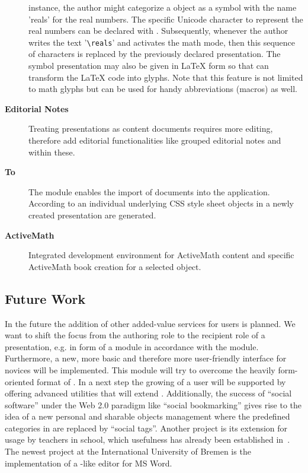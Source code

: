 \begin{description}
  instance, the author might categorize a {\ppt} object as a symbol with the name 'reals'
  for the real numbers. The specific Unicode character to represent the real numbers can
  be declared with {\cpoint}. Subsequently, whenever the author writes the text
  '\verb|\reals|' and activates the math mode, then this sequence of characters is
  replaced by the previously declared presentation. The symbol presentation may also be
  given in {\LaTeX} form so that {\texpoint} can transform the {\LaTeX} code into {\ppt}
  glyphs. Note that this feature is not limited to math glyphs but can be used for handy
  abbreviations (macros) as well.
\item[{\bf Editorial Notes}\twin{editorial}{note}] Treating {\ppt} presentations as
  content documents requires more editing, therefore {\cpnotes} add editorial
  functionalities like grouped editorial notes and {} within these.
\item[{\bf {\omdoc} To {\ppt}}] The {\cpimport} module enables the import of {\omdoc}
  documents into the {\ppt} application. According to an individual underlying CSS style sheet {\ppt}
  objects in a newly created {\ppt} presentation are generated.
\item[{\bf ActiveMath}] Integrated development environment for ActiveMath content and
  specific ActiveMath book creation for a selected {\ppt} object.
\end{description}

\subsection{Future Work}
In the future the addition of other added-value services for users is planned. We want to
shift the focus from the authoring role to the recipient role of a {\ppt} presentation,
e.g. in form of a {\cpstudent} module in accordance with the {\cpauthor} module.
Furthermore, a new, more basic and therefore more user-friendly interface for {\cpoint}
novices will be implemented. This {\cpbasic} module will try to overcome the heavily
form-oriented format of {\cpoint}. In a next step the growing of a {\cpoint} user will be
supported by offering advanced {\cpoint} utilities that will extend {\cpbasic}.
Additionally, the success of ``social software'' under the Web 2.0 paradigm like ``social
bookmarking'' gives rise to the idea of a new personal and sharable {\ppt} objects
management where the predefined categories in {\cpoint} are replaced by ``social tags''.
Another {\cpoint} project is its extension for usage by teachers in school, which
usefulness has already been established in~\cite{Kohlhase:emPowerPoint}. The newest
project at the International University of Bremen is the implementation of a
{\cpoint}-like editor for MS Word.


